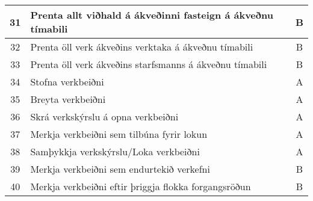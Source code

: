 \documentclass[a4paper]{article}
\begin{document}
\begin{tabular}{|c|p{10cm}|c|}
\hline
31&Prenta allt viðhald á ákveðinni fasteign á ákveðnu tímabili&B\\
\hline
32&Prenta öll verk ákveðins verktaka á ákveðnu tímabili&B\\
\hline
33&Prenta öll verk ákveðins starfsmanns á ákveðnu tímabili&B\\
\hline
34&Stofna verkbeiðni&A\\
\hline
35&Breyta verkbeiðni&A\\
\hline
36&Skrá verkskýrslu á opna verkbeiðni&A\\
\hline
37&Merkja verkbeiðni sem tilbúna fyrir lokun&A\\
\hline
38&Samþykkja verkskýrslu/Loka verkbeiðni&A\\
\hline
39&Merkja verkbeiðni sem endurtekið verkefni&B\\
\hline
40&Merkja verkbeiðni eftir þriggja flokka forgangsröðun&B\\
\hline
\end{tabular}
\end{document}
